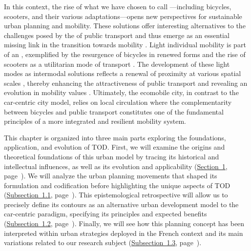 \begin{refsegment}
In this context, the rise of what we have chosen to call —including bicycles, scooters, and their various adaptations—opens new perspectives for sustainable urban planning and mobility. These solutions offer interesting alternatives to the challenges posed by the  of public transport and thus emerge as an essential missing link in the transition towards  mobility \textcolor{blue}{\autocites[4]{sebban_complementarite_2003}[25]{amar_homo_2016}{heran_transition_2018}}. Light individual mobility is part of an , exemplified by the resurgence of bicycles in renewed forms and the rise of scooters as a utilitarian mode of transport \textcolor{blue}{\autocite[18]{amar_homo_2016}}. The development of these light modes as intermodal solutions reflects a renewal of proximity at various spatial scales \textcolor{blue}{\autocite{sadik-kahn_15-minute_2021}}, thereby enhancing the attractiveness of public transport and revealing an evolution in mobility values \textcolor{blue}{\autocite[110]{goletz_intermodality_2020}}. Ultimately, the ecomobile city, in contrast to the car-centric city model, relies on local circulation where the complementarity between bicycles and public transport constitutes one of the fundamental principles of a more integrated and resilient mobility system.%

This chapter is organized into three main parts exploring the foundations, application, and evolution of \acrshort{TOD}. First, we will examine the origins and theoretical foundations of this urban model by tracing its historical and intellectual influences, as well as its evolution and applicability (\hyperref[chap1:tod-presentation-generale]{Section~1}, page~\pageref{chap1:tod-presentation-generale}). We will analyze the urban planning movements that shaped its formulation and codification before highlighting the unique aspects of \acrshort{TOD} (\hyperref[chap1:tod-presentation-generale-origines]{Subsection~1.1}, page~\pageref{chap1:tod-presentation-generale-origines}). This epistemological retrospective will allow us to precisely define its contours as an alternative urban development model to the car-centric paradigm, specifying its principles and expected benefits (\hyperref[chap1:tod-presentation-generale-definition]{Subsection~1.2}, page~\pageref{chap1:tod-presentation-generale-definition}). Finally, we will see how this planning concept has been interpreted within urban strategies deployed in the French context and its main variations related to our research subject (\hyperref[chap1:tod-presentation-generale-declinaisons]{Subsection~1.3}, page~\pageref{chap1:tod-presentation-generale-declinaisons}).%


\end{refsegment}
